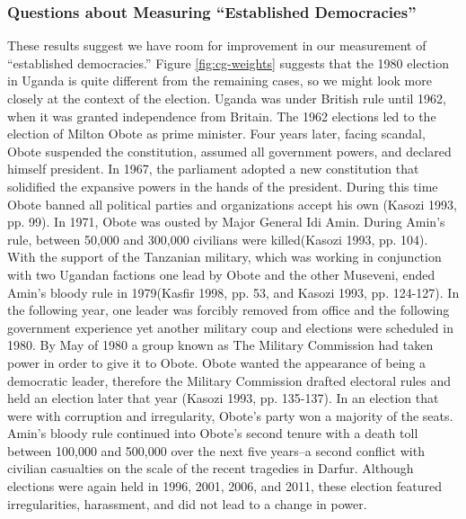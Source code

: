 \documentclass[12pt]{article}
\begin{document}
\subsubsection*{Questions about Measuring ``Established Democracies''}

These results suggest we have room for improvement in our measurement of ``established democracies.'' 
Figure \ref{fig:cg-weights} suggests that the 1980 election in Uganda is quite different from the remaining cases, so we might look more closely at the context of the election.
Uganda was under British rule until 1962, when it was granted independence from Britain. 
The 1962 elections led to the election of Milton Obote as prime minister. 
Four years later, facing scandal, Obote suspended the constitution, assumed all government powers, and declared himself president. 
In 1967, the parliament adopted a new constitution that solidified the expansive powers in the hands of the president. 
During this time Obote banned all political parties and organizations accept his own (Kasozi 1993, pp. 99). 
In 1971, Obote was ousted by Major General Idi Amin. During Amin's rule, between 50,000 and 300,000 civilians were killed(Kasozi 1993, pp. 104). 
With the support of the Tanzanian military, which was working in conjunction with two Ugandan factions one lead by Obote and the other Museveni, ended Amin's bloody rule in 1979(Kasfir 1998, pp. 53, and Kasozi 1993, pp. 124-127).
In the following year, one leader was forcibly removed from office and the following government experience yet another military coup and elections were scheduled in 1980. 
By May of 1980 a group known as The Military Commission had taken power in order to give it to Obote. 
Obote wanted the appearance of being a democratic leader, therefore the Military Commission drafted electoral rules and held an election later that year (Kasozi 1993, pp. 135-137).
In an election that were with corruption and irregularity, Obote's party won a majority of the seats. 
Amin's bloody rule continued into Obote's second tenure with a death toll between 100,000 and 500,000 over the next five years--a second conflict with civilian casualties on the scale of the recent tragedies in Darfur. 
Although elections were again held in 1996, 2001, 2006, and 2011, these election featured irregularities, harassment, and did not lead to a change in power.
\end{document}
